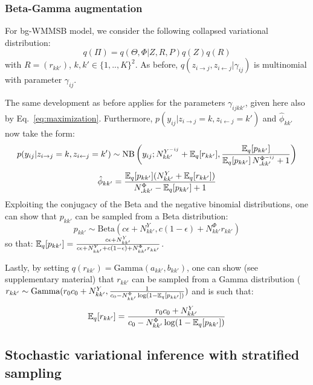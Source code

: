 \subsubsection{Beta-Gamma augmentation}

For bg-WMMSB model, we consider the following collapsed variational distribution:
%
\begin{equation*}
q(\Pi) = q(\Theta, \Phi|Z, R, P)q(Z)q(R)
\end{equation*}
%
with $R=(r_{kk'})$, $k,k' \in \{1,..,K\}^2$. As before, $q(z_{i \rightarrow j}, z_{i \leftarrow j}|\gamma_{ij})$ is multinomial with parameter $\gamma_{ij}$. 

The same development as before applies for the parameters $\gamma_{ijkk'}$, given here also by Eq.~\ref{eq:maximization}. Furthermore, $p(y_{ij}|z_{i \rightarrow j}=k,z_{i \leftarrow j}=k')$ and $\hat \phi_{kk'}$ now take the form:
%
\[
p(y_{ij} | z_{i \rightarrow j} = k,z_{i \leftarrow j} = k')  \sim \mathrm{NB}\left(y_{ij}; N^{Y^{-ij}}_{kk'} + \mathbb{E}_{q}[r_{kk'}], \frac{\mathbb{E}_{q}[p_{kk'}]}{\mathbb{E}_{q}[p_{kk'}]\,N^{\Phi^{-ij}}_{\bm{.}kk'} + 1} \right)
\]
\[
\hat \phi_{kk'} = \frac{\mathbb{E}_{q}[p_{kk'}](N^Y_{kk'} + \mathbb{E}_{q}[r_{kk'}])}{N^{\Phi}_{\bm{.}kk'} - \mathbb{E}_{q}[p_{kk'}] + 1}
\]
%
Exploiting the conjugacy of the Beta and the negative binomial distributions, one can show that $p_{kk'}$ can be sampled from a Beta distribution:
%
\begin{equation} \label{eq:pk_update}
p_{kk'} \sim \textrm{Beta}(c\epsilon + N^Y_{kk'}, c(1-\epsilon) + N^\Phi_{kk'}r_{kk'})
\end{equation}
%
so that: $\mathbb{E}_{q}[p_{kk'}] = \frac{c\epsilon + N^Y_{kk'}}{c\epsilon + N^Y_{kk'} + c(1-\epsilon) + N^\Phi_{kk'}r_{kk'}}$.

Lastly, by setting $q(r_{kk'}) = \textrm{Gamma}(a_{kk'},b_{kk'})$, one can show (see supplementary material) that $r_{kk'}$ can be sampled from a Gamma distribution ($r_{kk'} \sim \textrm{Gamma}(r_0c_0+N^Y_{kk'},\frac{1}{c_0  -N^\Phi_{kk'}\log(1-\mathbb{E}_{q}[p_{kk'}])})$ and is such that:
%
\begin{equation}
\mathbb{E}_{q}[r_{kk'}] = \frac{r_0c_0+N^Y_{kk'}}{c_0  -N^\Phi_{kk'}\log(1-\mathbb{E}_{q}[p_{kk'}])}
\end{equation}

\subsection{Stochastic variational inference with stratified sampling}

